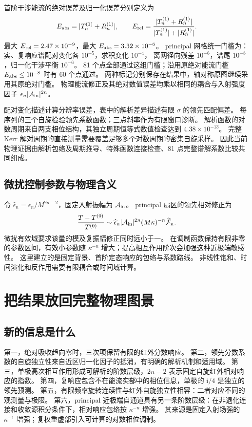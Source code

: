 \documentclass[UTF8,fontset=fandol,11pt,a4paper]{ctexart}
\newcommand{\ii}{\mathrm{i}}
\numberwithin{equation}{section}
\begin{document}
首阶干涉能流的绝对误差及归一化误差分别定义为
\begin{equation}
E_{\rm abs}=|T_n^{(1)}+R_n^{(1)}|,\qquad
E_{\rm rel}=\frac{|T_n^{(1)}+R_n^{(1)}|}{|T_n^{(1)}|+|R_n^{(1)}|}.
\end{equation}
最大 $E_{\rm rel}=2.47\times10^{-9}$，最大 $E_{\rm abs}=3.32\times10^{-6}$。
principal 网格统一门槛为：实、复响应谱配对变化各 $10^{-5}$，求积变化 $10^{-4}$，
离网径向残差 $10^{-6}$，谱尾 $10^{-8}$，归一化干涉平衡 $10^{-6}$。
81 个点全部通过这组门槛；沿用原绝对能流门槛 $E_{\rm abs}\le10^{-8}$ 时有 60 个点通过。
两种标记分别保存在结果中，轴对称原图继续采用其原绝对门槛。
物理能流修正及其绝对数值误差均乘以相同的耦合与入射强度因子 $\epsilon_n|\mathcal A_{\rm in}|^{2n}$。

配对变化描述计算分辨率误差，表中的解析差异描述有限 $\sigma$ 的领先匹配偏差。
每序列的三个自旋检验领先系数函数；三点斜率作为有限窗口诊断。
解析函数的对数周期来自两支相位结构，其独立周期恒等式数值检查达到 $4.38\times10^{-13}$。
完整 Kerr 解对周期的直接测量需要覆盖足够多个对数周期的密集自旋采样。
因此当前物理证据由解析包络及周期推导、特殊函数连接检查、81 点完整谱解系数比较共同组成。

\subsection{微扰控制参数与物理含义}
令 $\widehat\epsilon_n=\epsilon_n/M^{2n-2}$，固定入射振幅为 $\mathcal A_{\rm in}$。
principal 扇区的领先相对修正为
\begin{equation}
\frac{T-T^{(0)}}{T^{(0)}}
\sim\widehat\epsilon_n|\mathcal A_{\rm in}|^{2n}
(M\kappa)^{-n}\widetilde{\mathcal F}_n.
\end{equation}
微扰有效域要求该量的模及复振幅修正同时远小于一。
在调制函数保持有限非零的参数区间，有效小参数随 $\kappa^{-n}$ 增大；提高相互作用阶次会加强这种近极端敏感性。
这里建立的是固定背景、首阶定态响应的包络与系数路线。
非线性饱和、时间演化和反作用需要有限耦合或时间域计算。

\section{把结果放回完整物理图景}
\subsection{新的信息是什么}
第一，绝对吸收趋向零时，三次项保留有限的红外分数响应。
第二，领先分数系数的自旋独立性来自近区归一化因子的抵消，有明确的解析机制和适用域。
第三，单极高次相互作用形成可解析的阶数层级，$2n-2$ 表示固定自旋红外相对响应的指数。
第四，复响应包含不在能流实部中的相位信息，单极的 $\ii/4$ 是独立的领先预测。
第五，有限频率旋转连续性与红外自旋独立性相容：二者对应不同的观测量与极限。
第六，principal 近极端自通道具有另一条阶数层级：在非退化连接和收敛源积分条件下，相对响应包络按 $\kappa^{-n}$ 增强。
其来源是固定入射场强的 $\kappa^{-1}$ 增强；复权重虚部引入可计算的对数相位调制。
\end{document}
